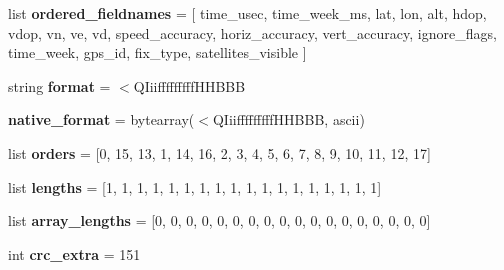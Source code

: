\begin{DoxyCompactItemize}
list {\bfseries ordered\+\_\+fieldnames} = \mbox{[} \textquotesingle{}time\+\_\+usec\textquotesingle{}, \textquotesingle{}time\+\_\+week\+\_\+ms\textquotesingle{}, \textquotesingle{}lat\textquotesingle{}, \textquotesingle{}lon\textquotesingle{}, \textquotesingle{}alt\textquotesingle{}, \textquotesingle{}hdop\textquotesingle{}, \textquotesingle{}vdop\textquotesingle{}, \textquotesingle{}vn\textquotesingle{}, \textquotesingle{}ve\textquotesingle{}, \textquotesingle{}vd\textquotesingle{}, \textquotesingle{}speed\+\_\+accuracy\textquotesingle{}, \textquotesingle{}horiz\+\_\+accuracy\textquotesingle{}, \textquotesingle{}vert\+\_\+accuracy\textquotesingle{}, \textquotesingle{}ignore\+\_\+flags\textquotesingle{}, \textquotesingle{}time\+\_\+week\textquotesingle{}, \textquotesingle{}gps\+\_\+id\textquotesingle{}, \textquotesingle{}fix\+\_\+type\textquotesingle{}, \textquotesingle{}satellites\+\_\+visible\textquotesingle{} \mbox{]}
\item 
\mbox{\label{classpymavlink_1_1dialects_1_1v10_1_1MAVLink__gps__input__message_af8758da4b8dfd512fe4f376806d6f69b}} 
string {\bfseries format} = \textquotesingle{}$<$Q\+Iiifffffffff\+H\+H\+B\+BB\textquotesingle{}
\item 
\mbox{\label{classpymavlink_1_1dialects_1_1v10_1_1MAVLink__gps__input__message_a06b65e8078eb222f1ed2344f49af7683}} 
{\bfseries native\+\_\+format} = bytearray(\textquotesingle{}$<$Q\+Iiifffffffff\+H\+H\+B\+BB\textquotesingle{}, \textquotesingle{}ascii\textquotesingle{})
\item 
\mbox{\label{classpymavlink_1_1dialects_1_1v10_1_1MAVLink__gps__input__message_aab61268f36e6287129d4a2727d2ed5f8}} 
list {\bfseries orders} = \mbox{[}0, 15, 13, 1, 14, 16, 2, 3, 4, 5, 6, 7, 8, 9, 10, 11, 12, 17\mbox{]}
\item 
\mbox{\label{classpymavlink_1_1dialects_1_1v10_1_1MAVLink__gps__input__message_a066bdc5c5d8d569569b200b5a6842999}} 
list {\bfseries lengths} = \mbox{[}1, 1, 1, 1, 1, 1, 1, 1, 1, 1, 1, 1, 1, 1, 1, 1, 1, 1\mbox{]}
\item 
\mbox{\label{classpymavlink_1_1dialects_1_1v10_1_1MAVLink__gps__input__message_af5f37f8479887e7e6d690e8f4ef00dcb}} 
list {\bfseries array\+\_\+lengths} = \mbox{[}0, 0, 0, 0, 0, 0, 0, 0, 0, 0, 0, 0, 0, 0, 0, 0, 0, 0\mbox{]}
\item 
\mbox{\label{classpymavlink_1_1dialects_1_1v10_1_1MAVLink__gps__input__message_a5515148c1e7f6d9228413a60a1d1370f}} 
int {\bfseries crc\+\_\+extra} = 151
\end{DoxyCompactItemize}



